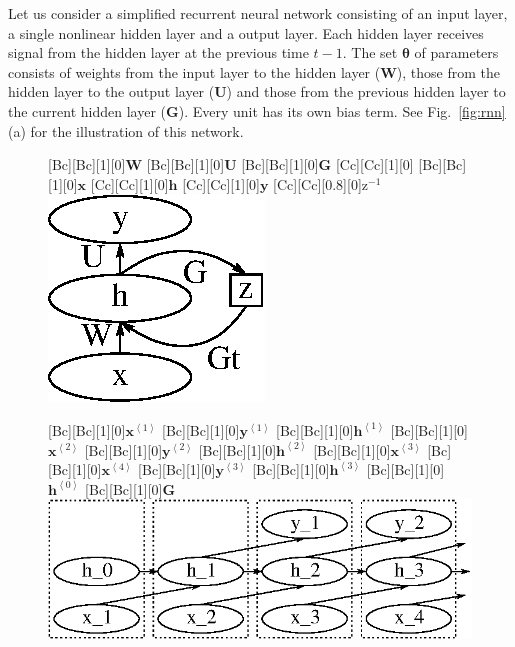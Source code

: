 \documentclass[dissertation,nocontribution]{aaltoseries}
\newcommand{\qt}[1]{\left<#1\right>}
\newcommand{\vect}[1]{\mathbf{#1}}
\newcommand{\vects}[1]{\boldsymbol{#1}}
\newcommand{\matr}[1]{\mathbf{#1}}
\newcommand{\vh}[0]{\vect{h}}
\newcommand{\vx}[0]{\vect{x}}
\newcommand{\vy}[0]{\vect{y}}
\newcommand{\mW}[0]{\matr{W}}
\newcommand{\mG}[0]{\matr{G}}
\newcommand{\mU}[0]{\matr{U}}
\newcommand{\TT}[0]{{\vects{\theta}}}
\begin{document}
Let us consider a simplified recurrent neural network
consisting of an input layer, a single nonlinear hidden
layer and a output layer. Each hidden layer receives signal
from the hidden layer at the previous time $t-1$. The set
$\TT$ of parameters consists of weights from the input layer
to the hidden layer ($\mW$), those from the hidden layer to
the output layer ($\mU$) and those from the previous hidden
layer to the current hidden layer ($\mG$).  Every unit has
its own bias term. See Fig.~\ref{fig:rnn}(a) for the
illustration of this network.

\begin{figure}[t]
    \begin{minipage}{0.40\textwidth}
        \centering
        [Bc][Bc][1][0]{$\mW$}
        [Bc][Bc][1][0]{$\mU$}
        [Bc][Bc][1][0]{$\mG$}
        [Cc][Cc][1][0]{}
        [Bc][Bc][1][0]{$\vx$}
        [Cc][Cc][1][0]{$\vh$}
        [Cc][Cc][1][0]{$\vy$}
        [Cc][Cc][0.8][0]{$\text{z}^{-1}$}
        \includegraphics[width=0.65\columnwidth]{figures/rnn.eps}
    \end{minipage}
    \begin{minipage}{0.58\textwidth}
        \centering
        [Bc][Bc][1][0]{$\vx^{\qt{1}}$}
        [Bc][Bc][1][0]{$\vy^{\qt{1}}$}
        [Bc][Bc][1][0]{$\vh^{\qt{1}}$}
        [Bc][Bc][1][0]{$\vx^{\qt{2}}$}
        [Bc][Bc][1][0]{$\vy^{\qt{2}}$}
        [Bc][Bc][1][0]{$\vh^{\qt{2}}$}
        [Bc][Bc][1][0]{$\vx^{\qt{3}}$}
        [Bc][Bc][1][0]{$\vx^{\qt{4}}$}
        [Bc][Bc][1][0]{$\vy^{\qt{3}}$}
        [Bc][Bc][1][0]{$\vh^{\qt{3}}$}
        [Bc][Bc][1][0]{$\vh^{\qt{0}}$}
        [Bc][Bc][1][0]{$\mG$}
        \includegraphics[width=\columnwidth]{figures/rnn_tf.eps}
    \end{minipage}


\end{figure}
\end{document}
